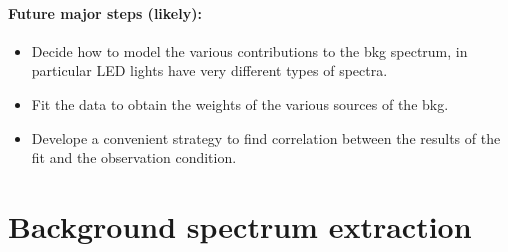 \documentclass{article}
\begin{document}
\paragraph{Future major steps (likely):}
\begin{itemize}
	\item Decide how to model the various contributions to the bkg spectrum, in particular LED lights have very different types of spectra.
	\item Fit the data to obtain the weights of the various sources of the bkg.
	\item Develope a convenient strategy to find correlation between the results of the fit and the observation condition.
\end{itemize}

\section{Background spectrum extraction}
\end{document}
